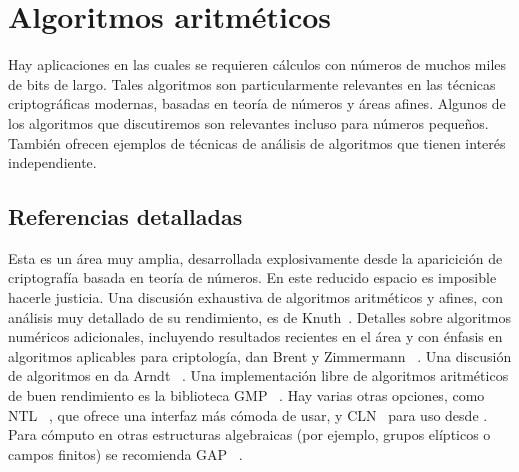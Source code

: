 %

\chapter{Algoritmos aritméticos}
\label{cha:algoritmos}

  Hay aplicaciones en las cuales se requieren cálculos
  con números de muchos miles de bits de largo.
  Tales algoritmos son particularmente relevantes
  en las técnicas criptográficas modernas,
  basadas en teoría de números y áreas afines.
  Algunos de los algoritmos que discutiremos son relevantes
  incluso para números pequeños.
  También ofrecen ejemplos de técnicas de análisis de algoritmos
  que tienen interés independiente.

\section{Referencias detalladas}
\label{sec:referencias-detalladas}

  Esta es un área muy amplia,
  desarrollada explosivamente desde la aparicición de criptografía
  basada en teoría de números.
  En este reducido espacio es imposible hacerle justicia.
  Una discusión exhaustiva de algoritmos aritméticos y afines,
  con análisis muy detallado de su rendimiento,
  es de Knuth~\cite{knuth97:_semin_algor}.
  Detalles sobre algoritmos numéricos adicionales,
  incluyendo resultados recientes en el área
  y con énfasis en algoritmos aplicables para criptología,
  dan Brent y Zimmermann~%
    \cite{brent10:_moder_comput_arith}.
  Una discusión de algoritmos en \cplusplus{}%
  da Arndt~%
    \cite{arndt11:_matters_computational}.
  Una implementación libre de algoritmos aritméticos
  de buen rendimiento es la biblioteca GMP~%
     \cite{granlund14:_gnu_multip_precis_arith_librar}.%
  Hay varias otras opciones,
  como NTL~%
     \cite{shoup14:_ntl},%
  que ofrece una interfaz más cómoda de usar,
  y CLN~%
    \cite{haible14:_CLN_1.3.4}%
  para uso desde \cplusplus.
  Para cómputo en otras estructuras algebraicas
  (por ejemplo,
   grupos elípticos o campos finitos)
  se recomienda GAP~%
    \cite{GAP:4.7.5}.%

